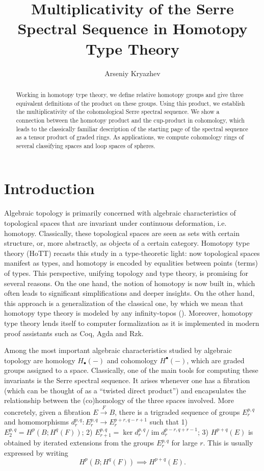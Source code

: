 \documentclass{amsart}
\title[Multiplicative Serre spectral sequences in HoTT]
{Multiplicativity of the Serre Spectral Sequence in Homotopy Type Theory}
\author{Arseniy Kryazhev}
\theoremstyle{definition}
\newcommand{\im}{\operatorname{im}}
\begin{document}
\begin{abstract}
Working in homotopy type theory, we define relative homotopy groups and give three equivalent definitions of the product on these groups. Using this product, we establish the multiplicativity of the cohomological Serre spectral sequence. We show a connection between the homotopy product and the cup-product in cohomology, which leads to the classically familiar description of the starting page of the spectral sequence as a tensor product of graded rings.
As applications, we compute cohomology rings of several classifying spaces and
loop spaces of spheres.
\end{abstract}

\maketitle

\tableofcontents

\section{Introduction}

Algebraic topology is primarily concerned with algebraic characteristics of topological spaces that are invariant under continuous deformation, i.e. homotopy. Classically, these topological spaces are seen as sets with certain structure, or, more abstractly, as objects of a certain category. Homotopy type theory (HoTT) recasts this study in a type-theoretic light: now topological spaces manifest as types, and
homotopy is encoded by equalities between points (terms) of types. This perspective, unifying topology and type theory, is promising for several reasons. On the one hand, the notion of homotopy is now built in, which often leads to significant simplifications and deeper insights. On the other hand, this approach is a generalization of the classical one, by which we mean that homotopy type theory is modeled by any infinity-topos (\cite{Shu}). Moreover, homotopy type theory lends itself to computer formalization as it is implemented in modern proof assistants such as Coq, Agda and Rzk.

Among the most important algebraic characteristics studied by algebraic topology are homology $H_\bullet(-)$ and cohomology $H^\bullet(-)$, which are graded groups assigned to a space. Classically, one of the main tools for computing these invariants is the Serre spectral sequence.
It arises whenever one has a fibration (which can be thought of as a ``twisted direct product'') and encapsulates the relationship between the (co)homology of the three spaces involved. More concretely, given a fibration $E \xrightarrow{F} B$, there is a trigraded sequence of groups $E^{p,q}_r$ and homomorphisms $d^{p,q}_r: E^{p,q}_r \to E^{p+r,q-r+1}_r$ such that 1) $E^{p,q}_2 = H^p(B; H^q(F))$; 2) $E^{p,q}_{r+1} = \ker{d_r^{p,q}}/\im d_r^{p-r,q+r-1}$; 3) $H^{p+q}(E)$ is obtained by iterated extensions from the groups $E^{p,q}_r$ for large $r$. This is usually expressed by writing
$$ H^p(B; H^q(F)) \implies H^{p+q}(E) .$$
\end{document}
